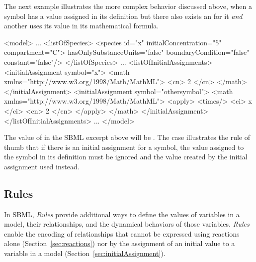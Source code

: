 The next example illustrates the more complex behavior discussed
above, when a symbol has a value assigned in its definition but
there also exists an \InitialAssignment for it \emph{and} another
\InitialAssignment uses its value in its mathematical formula.

\begin{example}
<model>
    ...
    <listOfSpecies>
        <species id="x" initialConcentration="5" compartment="C">
                 hasOnlySubstanceUnits="false" boundaryCondition="false" 
                 constant="false"/>
    </listOfSpecies>
    ...
    <listOfInitialAssignments>
        <initialAssignment symbol="x">
            <math xmlns="http://www.w3.org/1998/Math/MathML">
                <cn> 2 </cn>
            </math>
        </initialAssignment>
        <initialAssignment symbol="othersymbol">
            <math xmlns="http://www.w3.org/1998/Math/MathML">
                <apply>
                    <times/>
                    <ci> x </ci>
                    <cn> 2 </cn>
                </apply>
            </math>
        </initialAssignment>
    </listOfInitialAssignments>
    ...
</model>
\end{example}

The value of  in the SBML excerpt above will be
.  The case illustrates the rule of thumb that if there is
an initial assignment for a symbol, the value assigned to the
symbol in its definition must be ignored and the value created by
the initial assignment used instead.


\subsection{Rules}
\label{sec:rules}

In SBML, \emph{Rules} provide additional ways to define the values
of variables in a model, their relationships, and the dynamical
behaviors of those variables.  \emph{Rules} enable the encoding of
relationships that cannot be expressed using reactions alone
(Section~\ref{sec:reactions}) nor by the assignment of an initial
value to a variable in a model
(Section~\ref{sec:initialAssignment}).

